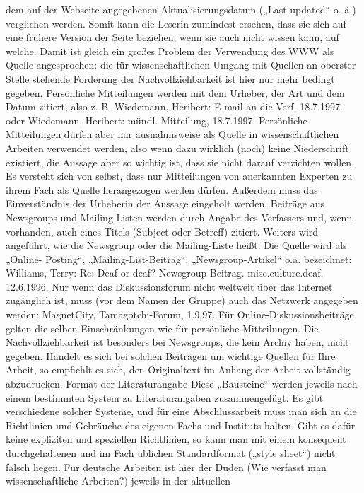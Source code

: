 \documentclass[]{book}
\theoremstyle{definition}
\theoremstyle{definition}
\theoremstyle{definition}
\theoremstyle{remark}
\begin{document}
dem auf der Webseite angegebenen Aktualisierungsdatum („Last updated``
o. ä.) verglichen werden. Somit kann die Leserin zumindest ersehen, dass
sie sich auf eine frühere Version der Seite beziehen, wenn sie auch
nicht wissen kann, auf welche. Damit ist gleich ein großes Problem der
Verwendung des WWW als Quelle angesprochen: die für wissenschaftlichen
Umgang mit Quellen an oberster Stelle stehende Forderung der
Nachvollziehbarkeit ist hier nur mehr bedingt gegeben. Persönliche
Mitteilungen werden mit dem Urheber, der Art und dem Datum zitiert, also
z. B. Wiedemann, Heribert: E-mail an die Verf. 18.7.1997. oder
Wiedemann, Heribert: mündl. Mitteilung, 18.7.1997. Persönliche
Mitteilungen dürfen aber nur ausnahmsweise als Quelle in
wissenschaftlichen Arbeiten verwendet werden, also wenn dazu wirklich
(noch) keine Niederschrift existiert, die Aussage aber so wichtig ist,
dass sie nicht darauf verzichten wollen. Es versteht sich von selbst,
dass nur Mitteilungen von anerkannten Experten zu ihrem Fach als Quelle
herangezogen werden dürfen. Außerdem muss das Einverständnis der
Urheberin der Aussage eingeholt werden. Beiträge aus Newsgroups und
Mailing-Listen werden durch Angabe des Verfassers und, wenn vorhanden,
auch eines Titels (Subject oder Betreff) zitiert. Weiters wird
angeführt, wie die Newsgroup oder die Mailing-Liste heißt. Die Quelle
wird als „Online- Posting``, „Mailing-List-Beitrag``,
„Newsgroup-Artikel`` o.ä. bezeichnet: Williams, Terry: Re: Deaf or deaf?
Newsgroup-Beitrag. misc.culture.deaf, 12.6.1996. Nur wenn das
Diskussionsforum nicht weltweit über das Internet zugänglich ist, muss
(vor dem Namen der Gruppe) auch das Netzwerk angegeben werden:
MagnetCity, Tamagotchi-Forum, 1.9.97. Für Online-Diskussionsbeiträge
gelten die selben Einschränkungen wie für persönliche Mitteilungen. Die
Nachvollziehbarkeit ist besonders bei Newsgroups, die kein Archiv haben,
nicht gegeben. Handelt es sich bei solchen Beiträgen um wichtige Quellen
für Ihre Arbeit, so empfiehlt es sich, den Originaltext im Anhang der
Arbeit vollständig abzudrucken. Format der Literaturangabe Diese
„Bausteine`` werden jeweils nach einem bestimmten System zu
Literaturangaben zusammengefügt. Es gibt verschiedene solcher Systeme,
und für eine Abschlussarbeit muss man sich an die Richtlinien und
Gebräuche des eigenen Fachs und Instituts halten. Gibt es dafür keine
expliziten und speziellen Richtlinien, so kann man mit einem konsequent
durchgehaltenen und im Fach üblichen Standardformat („style sheet``)
nicht falsch liegen. Für deutsche Arbeiten ist hier der Duden (Wie
verfasst man wissenschaftliche Arbeiten?) jeweils in der aktuellen
\end{document}
